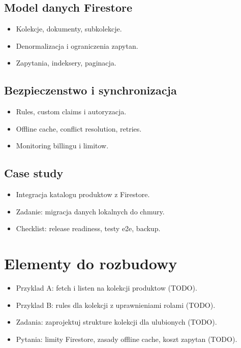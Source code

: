 \subsection{Model danych Firestore}
\begin{itemize}
  \item Kolekcje, dokumenty, subkolekcje.
  \item Denormalizacja i ograniczenia zapytan.
  \item Zapytania, indeksery, paginacja.
\end{itemize}

\subsection{Bezpieczenstwo i synchronizacja}
\begin{itemize}
  \item Rules, custom claims i autoryzacja.
  \item Offline cache, conflict resolution, retries.
  \item Monitoring billingu i limitow.
\end{itemize}

\subsection{Case study}
\begin{itemize}
  \item Integracja katalogu produktow z Firestore.
  \item Zadanie: migracja danych lokalnych do chmury.
  \item Checklist: release readiness, testy e2e, backup.
\end{itemize}

\section{Elementy do rozbudowy}
\begin{itemize}
  \item Przyklad A: fetch i listen na kolekcji produktow (TODO).
  \item Przyklad B: rules dla kolekcji z uprawnieniami rolami (TODO).
  \item Zadania: zaprojektuj strukture kolekcji dla ulubionych (TODO).
  \item Pytania: limity Firestore, zasady offline cache, koszt zapytan (TODO).
\end{itemize}


